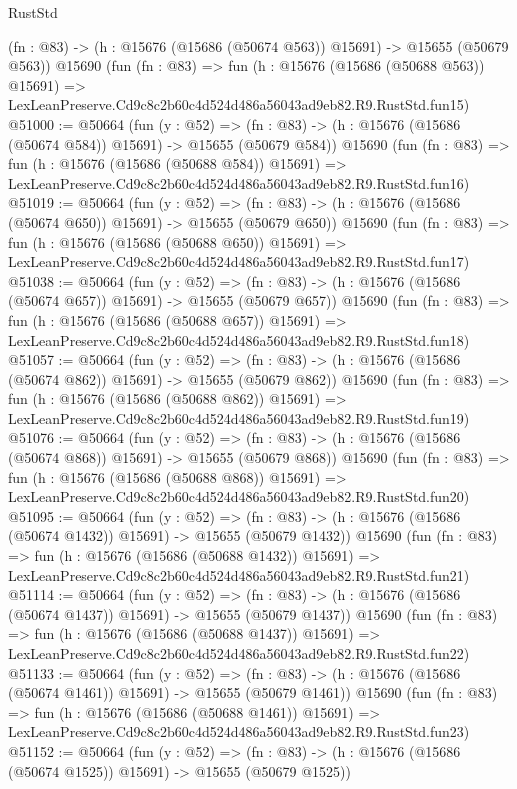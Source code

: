 \begin{lexlean}{RustStd}
\begin{coremodule}
    (fn : @83) -> (h : @15676 (@15686 (@50674 @563)) @15691) -> @15655 (@50679 @563))
    @15690
    (fun (fn : @83) =>
    fun (h : @15676 (@15686 (@50688 @563)) @15691) =>
    LexLeanPreserve.Cd9c8c2b60c4d524d486a56043ad9eb82.R9.RustStd.fun15)
@51000 := @50664
    (fun (y : @52) =>
    (fn : @83) -> (h : @15676 (@15686 (@50674 @584)) @15691) -> @15655 (@50679 @584))
    @15690
    (fun (fn : @83) =>
    fun (h : @15676 (@15686 (@50688 @584)) @15691) =>
    LexLeanPreserve.Cd9c8c2b60c4d524d486a56043ad9eb82.R9.RustStd.fun16)
@51019 := @50664
    (fun (y : @52) =>
    (fn : @83) -> (h : @15676 (@15686 (@50674 @650)) @15691) -> @15655 (@50679 @650))
    @15690
    (fun (fn : @83) =>
    fun (h : @15676 (@15686 (@50688 @650)) @15691) =>
    LexLeanPreserve.Cd9c8c2b60c4d524d486a56043ad9eb82.R9.RustStd.fun17)
@51038 := @50664
    (fun (y : @52) =>
    (fn : @83) -> (h : @15676 (@15686 (@50674 @657)) @15691) -> @15655 (@50679 @657))
    @15690
    (fun (fn : @83) =>
    fun (h : @15676 (@15686 (@50688 @657)) @15691) =>
    LexLeanPreserve.Cd9c8c2b60c4d524d486a56043ad9eb82.R9.RustStd.fun18)
@51057 := @50664
    (fun (y : @52) =>
    (fn : @83) -> (h : @15676 (@15686 (@50674 @862)) @15691) -> @15655 (@50679 @862))
    @15690
    (fun (fn : @83) =>
    fun (h : @15676 (@15686 (@50688 @862)) @15691) =>
    LexLeanPreserve.Cd9c8c2b60c4d524d486a56043ad9eb82.R9.RustStd.fun19)
@51076 := @50664
    (fun (y : @52) =>
    (fn : @83) -> (h : @15676 (@15686 (@50674 @868)) @15691) -> @15655 (@50679 @868))
    @15690
    (fun (fn : @83) =>
    fun (h : @15676 (@15686 (@50688 @868)) @15691) =>
    LexLeanPreserve.Cd9c8c2b60c4d524d486a56043ad9eb82.R9.RustStd.fun20)
@51095 := @50664
    (fun (y : @52) =>
    (fn : @83) -> (h : @15676 (@15686 (@50674 @1432)) @15691) -> @15655 (@50679 @1432))
    @15690
    (fun (fn : @83) =>
    fun (h : @15676 (@15686 (@50688 @1432)) @15691) =>
    LexLeanPreserve.Cd9c8c2b60c4d524d486a56043ad9eb82.R9.RustStd.fun21)
@51114 := @50664
    (fun (y : @52) =>
    (fn : @83) -> (h : @15676 (@15686 (@50674 @1437)) @15691) -> @15655 (@50679 @1437))
    @15690
    (fun (fn : @83) =>
    fun (h : @15676 (@15686 (@50688 @1437)) @15691) =>
    LexLeanPreserve.Cd9c8c2b60c4d524d486a56043ad9eb82.R9.RustStd.fun22)
@51133 := @50664
    (fun (y : @52) =>
    (fn : @83) -> (h : @15676 (@15686 (@50674 @1461)) @15691) -> @15655 (@50679 @1461))
    @15690
    (fun (fn : @83) =>
    fun (h : @15676 (@15686 (@50688 @1461)) @15691) =>
    LexLeanPreserve.Cd9c8c2b60c4d524d486a56043ad9eb82.R9.RustStd.fun23)
@51152 := @50664
    (fun (y : @52) =>
    (fn : @83) -> (h : @15676 (@15686 (@50674 @1525)) @15691) -> @15655 (@50679 @1525))

\end{coremodule}
\end{lexlean}
